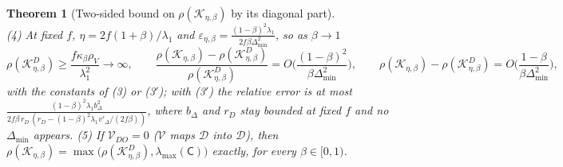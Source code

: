 \documentclass[11pt]{article}
\newtheorem{theorem}{Theorem}
\theoremstyle{remark}
\begin{document}
\begin{theorem}[Two-sided bound on $\rho(\mathcal K_{\eta,\beta})$ by its diagonal part]
\[\]
(4) At fixed $f$, $\eta=2f(1+\beta)/\lambda_1$ and $\varepsilon_{\eta,\beta}=\frac{(1-\beta)^2\lambda_1}{2f\beta\Delta_{\min}^2}$, so as $\beta\to1$
\[
\rho(\mathcal K^D_{\eta,\beta})\ge\frac{f\kappa_\beta\rho_V}{\lambda_1^2}\to\infty,\qquad
\frac{\rho(\mathcal K_{\eta,\beta})-\rho(\mathcal K^D_{\eta,\beta})}{\rho(\mathcal K^D_{\eta,\beta})}=O\Big(\frac{(1-\beta)^2}{\beta\Delta_{\min}^2}\Big),\qquad
\rho(\mathcal K_{\eta,\beta})-\rho(\mathcal K^D_{\eta,\beta})=O\Big(\frac{1-\beta}{\beta\Delta_{\min}^2}\Big),
\]
with the constants of (3) or (3$'$); with (3$'$) the relative error is at most $\frac{(1-\beta)^2\lambda_1b_\Delta^2}{2f\beta\,r_D\,(r_D-(1-\beta)^2\lambda_1v'_\Delta/(2f\beta))}$, where $b_\Delta$ and $r_D$ stay bounded at fixed $f$ and no $\Delta_{\min}$ appears.
(5) If $\mathcal V_{DO}=0$ ($\mathcal V$ maps $\mathcal D$ into $\mathcal D$), then $\rho(\mathcal K_{\eta,\beta})=\max\big(\rho(\mathcal K^D_{\eta,\beta}),\lambda_{\max}(\mathsf C)\big)$ exactly, for every $\beta\in[0,1)$.
\end{theorem}
\end{document}
